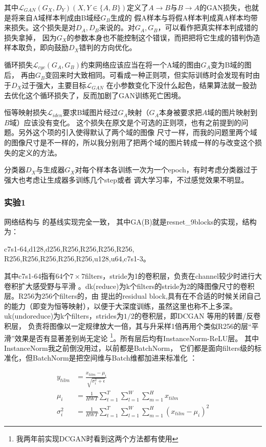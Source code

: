\documentclass[twocolumn,11pt]{ctexart}
\begin{document}
其中$\mathcal{L}_{GAN}(G_X,D_Y)(X,Y \in \{A,B\})$定义了$A \to B$与$B \to A$的GAN损失，也就是将来自A域样本判成由B域经$G_B$生成的
假A样本与将假A样本判成真A样本均带来损失。这个损失是对$D_A,D_B$来说的。对$G_A,G_B$，可以看作把真实样本判成错的损失拿掉，
因为$G_X$的参数本身也不能控制这个错误，而把把将它生成的错判伪造样本取负，即向鼓励$D_X$错判的方向优化。

循环损失$\mathcal{L}_{cyc}(G_A,G_B)$约束网络应该应当在将一个A域的图由$G_A$变为B域的图后，
再由$G_B$变回来时大致相同。可看成一种正则项，但实际训练时会发现有时由于$D_X$过于强大，主要目标$\mathcal{L}_{GAN}$
在小参数变化下没什么起色，结果算法就一股劲去优化这个循环损失了，反而加剧了GAN训练死亡困境。

恒等映射损失$\mathcal{L}_{iden}$要求B域图片经过$G_A$映射（$G_A$本身被要求把$A$域的图片映射到$B$域）应该没有变化。
这个损失在原文\cite{zhu2017unpaired}是个可选的正则项，也有之前提到的问题。另外这个项的引入使得默认了两个域的图像
尺寸一样，而我的问题里两个域的图像尺寸是不一样的，所以我分别用了把两个域的图片转成一样的与改变这个损失的定义的方法。

分类器$D_X$与生成器$G_X$对每个样本各训练一次为一个epoch，有时考虑分类器过于强大也考虑让生成器多训练几个step或者
调大学习率，不过感觉效果不明显。

\subsubsection{实验1}

网络结构与 \cite{zhu2017unpaired}的基线实现完全一致，
其中GA(B)就是resnet\_9blocks的实现，结构为：

c7s1-64,d128,d256,R256,R256,R256,R256,
R256,R256,R256,R256,R256,u128,u64,c7s1-3。

其中c7s1-64指有64个$7\times7$filters，stride为1的卷积层，负责在channel较少时进行大卷积扩大感受野与平滑
。dk(reduce)为k个filters的stride为2的降图像尺寸的卷积层。R256为256个filters的，由\cite{he2016deep}
提出的residual block,具有在不合适的时候关闭自己的能力（即变为恒等映射），以便于大深度训练，虽然这里也称不上多深。
uk(undoreduce)为k个filters，strides为$1/2$的卷积层，即DCGAN \cite{radford2015unsupervised}等用的转置/反卷积层，
负责将图像以一定规律放大一倍，其与升采样1倍再用个类似R256的层“平滑”效果是否有显著差别尚无定论
\footnote{我两年前实现DCGAN时看到这两个方法都有使用}。所有层后均有InstanceNorm-ReLU层。
其中InstanceNorm我之前倒没用过，以前都是BatchNorm，
它们都是面向filters级的标准化，但BatchNorm是把空间维与Batch维都加进来标准化 \cite{ioffe2015batch}：

\begin{align*}
y_{tilm} &= \frac{x_{tilm} - \mu_i}{\sqrt{\sigma_i^2 + \epsilon}} \\
\mu_i &= \frac{1}{HWT}\sum_{t=1}^T\sum_{l=1}^W\sum_{m=1}^H x_{tilm} \\
\sigma_i^2 &= \frac{1}{HWT}\sum_{t=1}^T\sum_{l=1}^W\sum_{m=1}^H (x_{tilm} - \mu_i)^2
\end{align*}
\end{document}
